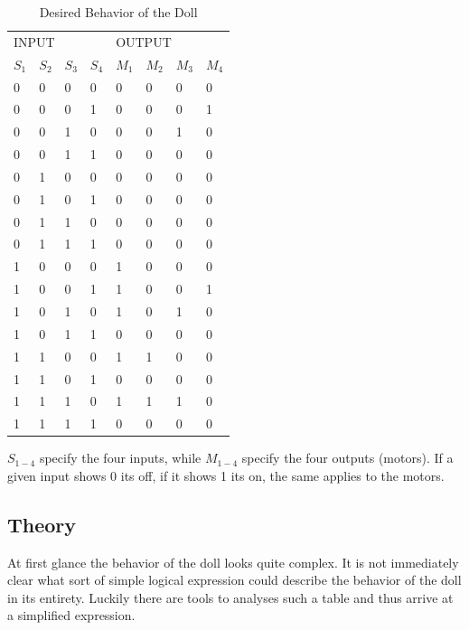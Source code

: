 \documentclass[14pt]{article}
\begin{document}
\begin{table}[H]
  \centering
  \begin{tabular}{llll|llll}
  \multicolumn{4}{l}{INPUT} & \multicolumn{4}{l}{OUTPUT} \\
  $S_1$ & $S_2$ & $S_3$ & $S_4$ & $M_1$ & $M_2$ & $M_3$ & $M_4$ \\
  \hline
  0    & 0    & 0    & 0    & 0     & 0    & 0    & 0    \\
  0    & 0    & 0    & 1    & 0     & 0    & 0    & 1    \\
  0    & 0    & 1    & 0    & 0     & 0    & 1    & 0    \\
  0    & 0    & 1    & 1    & 0     & 0    & 0    & 0    \\
  0    & 1    & 0    & 0    & 0     & 0    & 0    & 0    \\
  0    & 1    & 0    & 1    & 0     & 0    & 0    & 0    \\
  0    & 1    & 1    & 0    & 0     & 0    & 0    & 0    \\
  0    & 1    & 1    & 1    & 0     & 0    & 0    & 0    \\
  1    & 0    & 0    & 0    & 1     & 0    & 0    & 0    \\
  1    & 0    & 0    & 1    & 1     & 0    & 0    & 1    \\
  1    & 0    & 1    & 0    & 1     & 0    & 1    & 0    \\
  1    & 0    & 1    & 1    & 0     & 0    & 0    & 0    \\
  1    & 1    & 0    & 0    & 1     & 1    & 0    & 0    \\
  1    & 1    & 0    & 1    & 0     & 0    & 0    & 0    \\
  1    & 1    & 1    & 0    & 1     & 1    & 1    & 0    \\
  1    & 1    & 1    & 1    & 0     & 0    & 0    & 0   
  \end{tabular}
  \caption{\label{table:desired-behaviour} Desired Behavior of the Doll \autocite[Page 22]{ross}}
\end{table}

$S_{1-4}$ specify the four inputs, while $M_{1-4}$ specify the four outputs (motors). If a given input shows 0 its off, if it shows 1 its on, the same applies
to the motors.

\subsection{Theory}
At first glance the behavior of the doll looks quite complex. It is not immediately clear what sort of simple logical expression could describe
the behavior of the doll in its entirety. Luckily there are tools to analyses such a table and thus arrive at a simplified expression.\\
\end{document}
